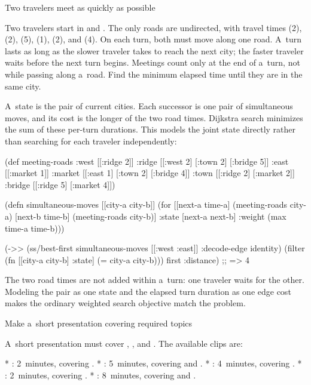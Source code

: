 {{\secc Two travelers meet as quickly as possible

 Two travelers start in  and
. The only roads are undirected, with travel times
 (2),  (2),
 (5),  (1),
 (2), and  (4).
On each turn, both must move along one road. A~turn lasts as
long as the slower traveler takes to reach the next city; the faster traveler
waits before the next turn begins. Meetings count only at the end of
a~turn, not while passing along a~road. Find the minimum elapsed time until
they are in the same city.

\smallskip
{} A~state is the pair of current cities. Each
successor is one pair of simultaneous moves, and its cost is the longer of
the two road times. Dijkstra search minimizes the sum of these per-turn
durations. This models the joint state directly rather than searching for
each traveler independently:

\begtt {}
(def meeting-roads
  {:west [[:ridge 2]]
   :ridge [[:west 2] [:town 2] [:bridge 5]]
   :east [[:market 1]]
   :market [[:east 1] [:town 2] [:bridge 4]]
   :town [[:ridge 2] [:market 2]]
   :bridge [[:ridge 5] [:market 4]]})

(defn simultaneous-moves [[city-a city-b]]
  (for [[next-a time-a] (meeting-roads city-a)
        [next-b time-b] (meeting-roads city-b)]
    {:state [next-a next-b]
     :weight (max time-a time-b)}))

(->> (ss/best-first simultaneous-moves
                        [[:west :east]]
                        {:decode-edge identity})
     (filter (fn [{[city-a city-b] :state}]
               (= city-a city-b)))
     first
     :distance)
;; => 4
\endtt

The two road times are not added within a~turn: one traveler waits for the
other. Modeling the pair as one state and the elapsed turn duration as one
edge cost makes the ordinary weighted search objective match the problem.

\secc Make a~short presentation covering required topics

 A~short presentation must cover ,
, and . The available clips are:

\begitems
* : 2~minutes, covering .
* : 5~minutes, covering  and
  .
* : 4~minutes, covering .
* : 2~minutes, covering .
* : 8~minutes, covering  and
  .
\enditems

}}

